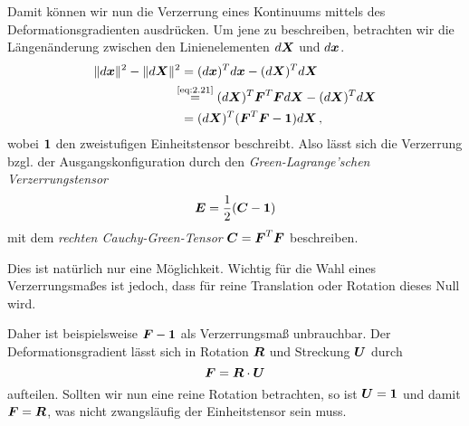 Damit können wir nun die Verzerrung eines Kontinuums mittels des Deformationsgradienten ausdrücken. Um jene zu beschreiben, betrachten wir die Längenänderung zwischen den Linienelementen $d\boldsymbol X$ und $d\boldsymbol x$.
\begin{align*}
	\lVert d\boldsymbol x\rVert^2-\lVert d\boldsymbol X\rVert^2 &= (d\boldsymbol x)^T d\boldsymbol x - (d\boldsymbol X)^Td\boldsymbol X \\
	& \! \! \!\!\: \!\!\: \stackrel{\scriptsize \eqref{eq:2.21}}= (d\boldsymbol X)^T \boldsymbol F^T \boldsymbol F d\boldsymbol X - (d\boldsymbol X)^Td\boldsymbol X \\
	& = (d\boldsymbol X)^T (\boldsymbol F^T \boldsymbol F- \boldsymbol 1) d\boldsymbol X \, ,
\end{align*}
wobei $\boldsymbol 1$ den zweistufigen Einheitstensor beschreibt. Also lässt sich die Verzerrung bzgl. der Ausgangskonfiguration durch den \textit{Green-Lagrange'schen Verzerrungstensor}
\begin{align}\label{eq:2.24}
	\boldsymbol E = \frac 1 2 (\boldsymbol C- \boldsymbol 1)
\end{align}
mit dem \textit{rechten Cauchy-Green-Tensor} $\boldsymbol C = \boldsymbol F^T\boldsymbol F$ beschreiben.


\begin{bem}
Dies ist natürlich nur eine Möglichkeit. Wichtig für die Wahl eines Verzerrungsmaßes ist jedoch, dass für reine Translation oder Rotation dieses Null wird. 

Daher ist beispielsweise $\boldsymbol F - \boldsymbol 1$ als Verzerrungsmaß unbrauchbar. Der Deformationsgradient lässt sich in Rotation $\boldsymbol R$ und Streckung $\boldsymbol U$ durch $$\boldsymbol F = \boldsymbol R \cdot \boldsymbol U$$ aufteilen. Sollten wir nun eine reine Rotation betrachten, so ist $\boldsymbol U = \boldsymbol 1$ und damit $\boldsymbol F = \boldsymbol R$, was nicht zwangsläufig der Einheitstensor sein muss.
\end{bem}



